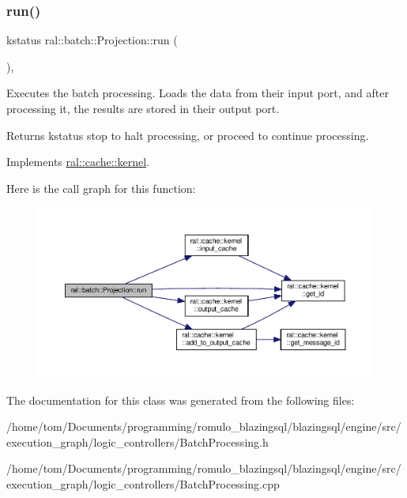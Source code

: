 \subsubsection{\texorpdfstring{run()}{run()}}
{\footnotesize\ttfamily kstatus ral\+::batch\+::\+Projection\+::run (\begin{DoxyParamCaption}{ }\end{DoxyParamCaption})\hspace{0.3cm}{\ttfamily [override]}, {\ttfamily [virtual]}}

Executes the batch processing. Loads the data from their input port, and after processing it, the results are stored in their output port. \begin{DoxyReturn}{Returns}
kstatus \textquotesingle{}stop\textquotesingle{} to halt processing, or \textquotesingle{}proceed\textquotesingle{} to continue processing. 
\end{DoxyReturn}


Implements \hyperlink{classral_1_1cache_1_1kernel_a735b081cccae9574924e74ea6d293ef7}{ral\+::cache\+::kernel}.

Here is the call graph for this function\+:\nopagebreak
\begin{figure}[H]
\begin{center}
\leavevmode
\includegraphics[width=350pt]{classral_1_1batch_1_1Projection_a14bafcd753d4bd86160bec679ac19058_cgraph}
\end{center}
\end{figure}


The documentation for this class was generated from the following files\+:\begin{DoxyCompactItemize}
\item 
/home/tom/\+Documents/programming/romulo\+\_\+blazingsql/blazingsql/engine/src/execution\+\_\+graph/logic\+\_\+controllers/Batch\+Processing.\+h\item 
/home/tom/\+Documents/programming/romulo\+\_\+blazingsql/blazingsql/engine/src/execution\+\_\+graph/logic\+\_\+controllers/Batch\+Processing.\+cpp\end{DoxyCompactItemize}
